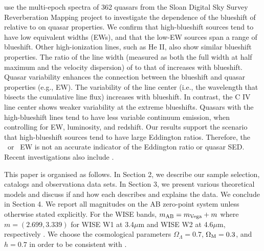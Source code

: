 \documentclass[a4paper,fleqn,usenatbib]{mnras}
\begin{document}
\citet{Sun2018} use the multi-epoch spectra of 362 quasars from the Sloan Digital Sky Survey Reverberation Mapping project to investigate the dependence of the blueshift of \civ relative to \mgii on quasar properties. We confirm that high-blueshift sources tend to have low \civ equivalent widths (EWs), and that the low-EW sources span a range of blueshift. Other high-ionization lines, such as He II, also show similar blueshift properties. The ratio of the line width (measured as both the full width at half maximum and the velocity dispersion) of \civ to that of \mgii increases with blueshift. Quasar variability enhances the connection between the \civ blueshift and quasar properties (e.g., EW). The variability of the \mgii line center (i.e., the wavelength that bisects the cumulative line flux) increases with blueshift. In contrast, the C IV line center shows weaker variability at the extreme blueshifts. Quasars with the high-blueshift \civ lines tend to have less variable continuum emission, when controlling for EW, luminosity, and redshift. Our results support the scenario that high-blueshift sources tend to have large Eddington ratios.
Therefore, the \civ\ or \heii\ EW is not an accurate indicator of the Eddington ratio or quasar SED.
Recent investigations also include \citet{Meyer2019}. 

This paper is organised as follows. In Section 2, we describe our
sample selection, catalogs and observationa data sets.  In Section 3,
we present various theoretical models and discuss if and how each
describes and explains the data.  We conclude in Section 4.  We report
all magnitudes on the AB zero-point system \citep{Oke_Gunn1983,
Fukugita1996} unless otherwise stated explicitly. For the WISE bands,
$m_{\rm AB} = m_{\rm Vega} + m$ where $m = (2.699, 3.339)$ for WISE W1
at 3.4$\mu$m and WISE W2 at 4.6$\mu$m, respectively
\citep{Cutri2011}. We choose the cosmological parameters
$\Omega_{\Lambda} = 0.7$, $\Omega_{\rm M} = 0.3$, and $h = 0.7$ in
order to be consistent with \citet{Shen2011}.


\end{document}
